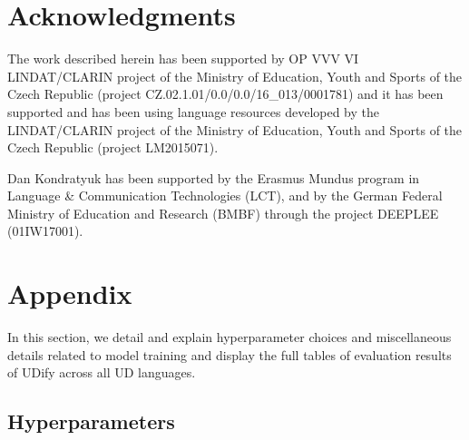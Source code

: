 \documentclass[11pt,a4paper]{article}
\begin{document}
\section*{Acknowledgments}

The work described herein has been supported by OP VVV VI LINDAT/CLARIN project
of the Ministry of Education, Youth and Sports of the Czech Republic (project
CZ.02.1.01/0.0/0.0/16\_013/0001781) and it has been supported and has been
using language resources developed by the LINDAT/CLARIN project of the Ministry
of Education, Youth and Sports of the Czech Republic (project LM2015071).

Dan Kondratyuk has been supported by the Erasmus Mundus program in Language \& Communication Technologies (LCT), and by the German Federal Ministry of Education and Research (BMBF) through the project DEEPLEE (01IW17001).




\appendix 

\section{Appendix} \label{sec:appendix}

In this section, we detail and explain hyperparameter choices and miscellaneous details related to model training and display the full tables of evaluation results of UDify across all UD languages.



\subsection{Hyperparameters} \label{sec:udify-hyperparameters} 
\end{document}
